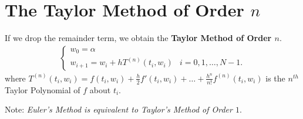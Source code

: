 \documentclass[12pt]{article}
\begin{document}
\section{The Taylor Method of Order $n$}
If we drop the remainder term, we obtain the \textbf{Taylor Method of Order $n$}.
\begin{align*}
  \begin{cases}
    w_0 = \alpha & \\
    w_{i+1} = w_i + hT^{(n)}(t_i, w_i) & i = 0, 1, \dots, N-1
  .\end{cases}
\end{align*}
where $T^{(n)}(t_i, w_i) = f(t_i, w_i) + \frac{h}{2}f'(t_i, w_i) + \dots + 
\frac{h^n}{n!}f^{(n)}(t_i, w_i)$ is the $n^{th}$ Taylor Polynomial of $f$ about
$t_i$.

Note: \textit{Euler's Method is equivalent to Taylor's Method of Order $1$}.
\end{document}
